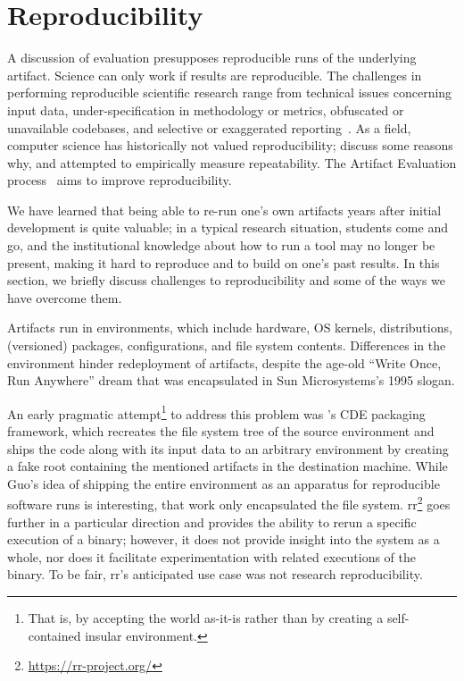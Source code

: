 \section{Reproducibility}
\label{sec:reproducibility}

A discussion of evaluation presupposes reproducible runs of the
underlying artifact. Science can only work if results are
reproducible.  The challenges in performing reproducible scientific
research range from technical issues concerning input data,
under-specification in methodology or metrics, obfuscated or
unavailable codebases, and selective or exaggerated
reporting~\cite{allison2018reproducibility}. As a field, computer
science has historically not valued reproducibility; 
discuss some reasons why, and 
attempted to empirically measure repeatability.
The Artifact Evaluation process~\cite{krishnamurthi:_about_artif_evaluat} aims
to improve reproducibility.

We have learned that being able to re-run one's own artifacts years after 
initial development is quite valuable; in a typical research situation,
students come and go, and the institutional knowledge about how to run a
tool may no longer be present, making it hard to reproduce and to build
on one's past results. In this section, we briefly discuss challenges
to reproducibility and some of the ways we have overcome them.

Artifacts run in environments, which include hardware, OS kernels,
distributions, (versioned) packages, configurations, and file system
contents. Differences in the environment hinder redeployment of artifacts,
despite the age-old ``Write Once, Run Anywhere'' dream that was encapsulated in
Sun Microsystems's 1995 slogan.

An early pragmatic attempt\footnote{That is, by accepting the world as-it-is rather than by creating a self-contained insular environment.} to address this problem was 's CDE 
packaging framework, which recreates the file system tree of the source environment and ships the code along with its input data to an arbitrary environment by creating a fake root containing the mentioned artifacts in the destination machine. While Guo's idea of shipping the entire environment as an apparatus for reproducible software runs is interesting, that work only encapsulated the file system. rr\footnote{\url{https://rr-project.org/}} goes further in a particular direction and provides the ability to rerun a specific execution of a binary; however, it does not provide insight into the system as a whole, nor does it facilitate experimentation with related executions of the binary. To be fair, rr's anticipated use case was not research reproducibility.

